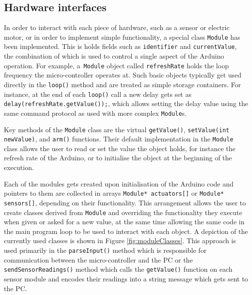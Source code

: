 \subsection{Hardware interfaces}
In order to interact with each piece of hardware, such as a sensor or electric motor, or in order to implement simple functionality, a special class \texttt{Module} has been implemented. This is holds fields such as \texttt{identifier} and \texttt{currentValue}, the combination of which is used to control a single aspect of the Arduino operation. For example, a~\texttt{Module} object called \texttt{refreshRate} holds the loop frequency the micro-controller operates at. Such basic objects typically get used directly in the \texttt{loop()} method and are treated as simple storage containers. For instance, at the end of each \texttt{loop()} call a new delay gets set as \texttt{delay(refreshRate.getValue());}, which allows setting the delay value using the same command protocol as used with more complex \texttt{Module}s.

Key methods of the \texttt{Module} class are the virtual \texttt{getValue()}, \texttt{setValue(int newValue)}, and \texttt{arm()} functions. Their default implementation in the \texttt{Module} class allows the user to read or set the value the object holds, for instance the refresh rate of the Arduino, or to initialise the object at the beginning of the execution.

Each of the modules gets created upon initialisation of the Arduino code and pointers to them are collected in arrays \texttt{Module* actuators[]} or \texttt{Module* sensors[]}, depending on their functionality. This arrangement allows the user to create classes derived from \texttt{Module} and overriding the functionality they execute when given or asked for a new value, at the same time allowing the same code in the main program loop to be used to interact with each object. A depiction of the currently used classes is shown in Figure \ref{fig:moduleClasses}. This approach is used primarily in the \texttt{parseInput()} method which is responsible for communication between the micro-controller and the PC or the \texttt{sendSensorReadings()} method which calls the \texttt{getValue()} function on each sensor module and encodes their readings into a string message which gets sent to the PC.

